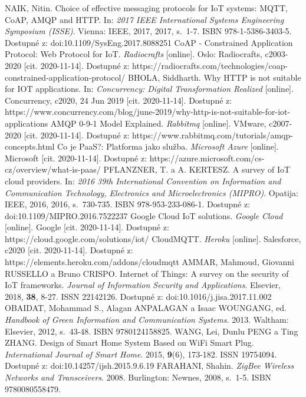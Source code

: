 \documentclass[twoside]{ctuthesis}
\theoremstyle{plain}
\theoremstyle{definition}
\theoremstyle{note}
\begin{document}
\begin{thebibliography}{46}
   NAIK, Nitin. Choice of effective messaging protocols for IoT systems: MQTT, CoAP, AMQP and HTTP. In: \textit{2017 IEEE International Systems Engineering Symposium (ISSE)}. Vienna: IEEE, 2017, 2017, s.~1-7. ISBN 978-1-5386-3403-5. Dostupné z: doi:10.1109/SysEng.2017.8088251  
    CoAP - Constrained Application Protocol: Web Protocol for IoT. \textit{Radiocrafts} [online]. Oslo: Radiocrafts, c2003-2020 [cit. 2020-11-14]. Dostupné z: https://radiocrafts.com/technologies/coap-constrained-application-protocol/
     BHOLA, Siddharth. Why HTTP is not suitable for IOT applications. In: \textit{Concurrency: Digital Transformation Realized} [online]. Concurrency, c2020, 24 Jun 2019 [cit. 2020-11-14]. Dostupné z: https://www.concurrency.com/blog/june-2019/why-http-is-not-suitable-for-iot-applications
 AMQP 0-9-1 Model Explained. \textit{Rabbitmq} [online]. VMware, c2007-2020 [cit. 2020-11-14]. Dostupné z: https://www.rabbitmq.com/tutorials/amqp-concepts.html
    Co je PaaS?: Platforma jako služba. \textit{Microsoft Azure} [online]. Microsoft [cit. 2020-11-14]. Dostupné z: https://azure.microsoft.com/cs-cz/overview/what-is-paas/   
    PFLANZNER, T. a A. KERTESZ. A survey of IoT cloud providers. In: \textit{2016 39th International Convention on Information and Communication Technology, Electronics and Microelectronics (MIPRO)}. Opatija: IEEE, 2016, 2016, s.~730-735. ISBN 978-953-233-086-1. Dostupné z: doi:10.1109/MIPRO.2016.7522237
  Google Cloud IoT solutions. \textit{Google Cloud} [online]. Google [cit. 2020-11-14]. Dostupné z: https://cloud.google.com/solutions/iot/
  CloudMQTT. \textit{Heroku} [online]. Salesforce, c2020 [cit. 2020-11-14]. Dostupné z: https://elements.heroku.com/addons/cloudmqtt
 AMMAR, Mahmoud, Giovanni RUSSELLO a Bruno CRISPO. Internet of Things: A survey on the security of IoT frameworks. \textit{Journal of Information Security and Applications}. Elsevier, 2018, \textbf{38}, 8-27. ISSN 22142126. Dostupné z: doi:10.1016/j.jisa.2017.11.002
 OBAIDAT, Mohammad S., Alagan ANPALAGAN a Isaac WOUNGANG, ed. \textit{Handbook of Green Information and Communication Systems}. 2013. Waltham: Elsevier, 2012, s.~43-48. ISBN 9780124158825.
 WANG, Lei, Dunlu PENG a Ting ZHANG. Design of Smart Home System Based on WiFi Smart Plug. \textit{International Journal of Smart Home}. 2015, \textbf{9}(6), 173-182. ISSN 19754094. Dostupné z: doi:10.14257/ijsh.2015.9.6.19
  FARAHANI, Shahin. \textit{ZigBee Wireless Networks and Transceivers}. 2008. Burlington: Newnes, 2008, s.~1-5. ISBN 9780080558479.

\end{thebibliography}
\end{document}
